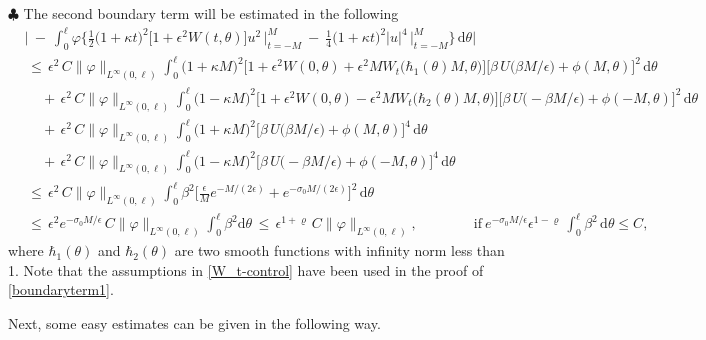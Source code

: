 \documentclass[10pt, reqno]{amsart}
\numberwithin{equation}{section}
\theoremstyle{definition}
\begin{document}
{{\smallskip
\noindent$\clubsuit$
 The second boundary term will be estimated in the following
\begin{align}
 &\Bigg|\ -\
 \int_0^\ell\varphi\Bigg\{\frac{1}{2}\big(1+\kappa t\big)^2 \big[1+ \epsilon^2 W(t, \theta)\big] u^2\, \Big|_{t=-{M}}^{M}
 \ -\
 \frac 1 4 \big(1+\kappa t\big)^2 |u|^4\, \Big|_{t=-{M}}^{M}\Bigg\} \,{\mathrm d}\theta\Bigg|
\nonumber\\[2mm]
 &\,\leq\, \epsilon^2\,C \|\varphi\|_{L^\infty(0,\ell)}\int_0^\ell\big(1+\kappa M\big)^2
 \big[1+ \epsilon^2 W(0, \theta)+\epsilon^2 MW_t\big(\hbar_1(\theta)M, \theta\big)\big]
 \Big[\beta \, U\big( \beta M/\epsilon\big) +\phi(M, \theta) \Big]^2
 \,{\mathrm d}\theta
\nonumber\\[2mm]
 &\quad\,+\, \epsilon^2\,C \|\varphi\|_{L^\infty(0,\ell)}\int_0^\ell\big(1-\kappa M\big)^2
 \big[1+ \epsilon^2 W(0, \theta)-\epsilon^2 MW_t\big(\hbar_2(\theta)M, \theta\big)\big]
 \Big[\beta \, U\big( -\beta M/\epsilon\big) +\phi(-M, \theta) \Big]^2
 \,{\mathrm d}\theta
\nonumber\\[2mm]
 &\quad\,+\, \epsilon^2\,C \|\varphi\|_{L^\infty(0,\ell)}\int_0^\ell\big(1+\kappa M\big)^2
 \Big[\beta \, U\big( \beta M/\epsilon\big) +\phi(M, \theta) \Big]^4
 \,{\mathrm d}\theta
\nonumber\\[2mm]
 &\quad\,+\, \epsilon^2\,C \|\varphi\|_{L^\infty(0,\ell)}\int_0^\ell\big(1-\kappa M\big)^2
 \Big[\beta \, U\big( -\beta M/\epsilon\big) +\phi(-M, \theta) \Big]^4
 \,{\mathrm d}\theta
\nonumber\\[2mm]
 &\,\leq\, \epsilon^2\,C \|\varphi\|_{L^\infty(0,\ell)}\int_0^\ell \beta^2
 \Big[\frac{\epsilon}{M}e^{-M/(2\epsilon)} +e^{-\sigma_0M/(2\epsilon)} \Big]^2
 \,{\mathrm d}\theta
\nonumber\\[2mm]
 &\,\leq\,
 \epsilon^2 e^{-\sigma_0 M/\epsilon}\,C \|\varphi\|_{L^\infty(0,\ell)}\displaystyle\int_0^{\ell}\beta^2 {\mathrm d}\theta
 \,\leq\,
 \epsilon^{1+\varrho}\,C \|\varphi\|_{L^\infty(0,\ell)},
 \qquad\qquad \mbox{if}\ e^{-\sigma_0 M/\epsilon}\epsilon^{1-\varrho}\,\int_0^\ell \beta^2\,{\mathrm d}\theta\leq C,
 \label{boundaryterm1}
\end{align}
 where $\hbar_1(\theta)$ and $\hbar_2(\theta)$ are two smooth functions with infinity norm less than 1.
 Note that the assumptions in \eqref{W_t-control} have been used in the proof of \eqref{boundaryterm1}.



\bigskip
{}
 Next, some easy estimates can be given in the following way.

}}
\end{document}
